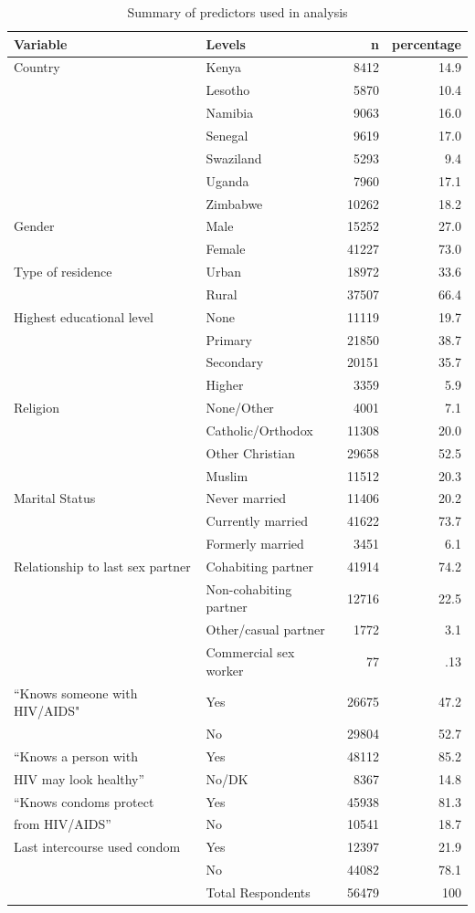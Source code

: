 \documentclass[10pt,letterpaper]{article}
\newcommand{\KnowsPWHA}{``Knows someone with HIV/AIDS"}
\begin{document}
\begin{center}
\begin{table}
  \caption{Summary of predictors used in analysis}
\begin{tabular}[pos]{| l | l | r | r | }
\hline
Variable & Levels & n & percentage\\
\hline
Country  & Kenya & 8412 & 14.9\\
& Lesotho &  5870 & 10.4\\
& Namibia &  9063 & 16.0\\
& Senegal &  9619 & 17.0\\
& Swaziland &  5293 & 9.4\\
& Uganda &  7960 & 17.1\\
& Zimbabwe &  10262 & 18.2\\
\hline
Gender & Male & 15252 & 27.0\\
& Female & 41227 & 73.0\\
\hline
Type of residence & Urban& 18972 & 33.6\\
& Rural & 37507 & 66.4\\
\hline
Highest educational level & None & 11119 & 19.7\\
& Primary & 21850 & 38.7\\
& Secondary & 20151 & 35.7\\
& Higher & 3359 & 5.9\\
\hline
Religion & None/Other & 4001 & 7.1\\
& Catholic/Orthodox & 11308 & 20.0\\
& Other Christian  & 29658 & 52.5\\
& Muslim           & 11512 & 20.3\\
\hline
Marital Status & Never married & 11406 & 20.2\\
& Currently married & 41622 & 73.7\\
& Formerly married & 3451 & 6.1\\
\hline
Relationship to last sex partner &  Cohabiting partner   & 41914 & 74.2\\
& Non-cohabiting partner & 12716  & 22.5\\
& Other/casual partner & 1772 & 3.1\\
& Commercial sex worker &  77 & .13\\
\hline
\KnowsPWHA & Yes & 26675 & 47.2\\
& No & 29804 & 52.7\\
\hline
``Knows a person with & Yes & 48112 & 85.2\\
HIV may look healthy'' & No/DK & 8367 & 14.8\\
\hline
``Knows condoms protect  & Yes & 45938 & 81.3\\
from HIV/AIDS'' & No & 10541 & 18.7\\
\hline
Last intercourse used condom & Yes & 12397 & 21.9\\
& No & 44082 & 78.1\\
\hline
& Total Respondents & 56479  & 100\\
\hline
\end{tabular}
\end{table}
\end{center}
\end{document}
